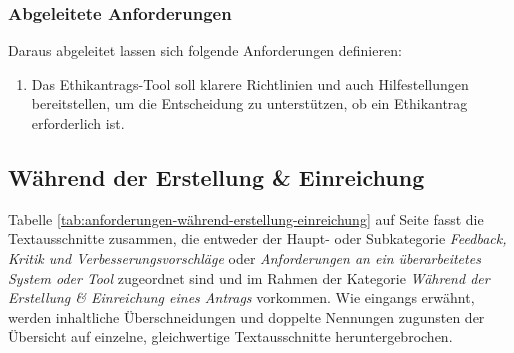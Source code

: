\documentclass[a4paper,12pt,twoside,numbers=noendperiod]{scrreprt}
\begin{document}
\subsubsection*{Abgeleitete Anforderungen}
\label{sub-sub-sec:abgeleitete-anforderungen-vorfeld-antrag}

Daraus abgeleitet lassen sich folgende Anforderungen definieren:
\begin{enumerate}[label=\textbf{\#\arabic*}]
    \item Das Ethikantrags-Tool soll klarere Richtlinien und auch Hilfestellungen bereitstellen, um die Entscheidung zu unterstützen, ob ein Ethikantrag erforderlich ist.
\end{enumerate}

\subsection{Während der Erstellung \& Einreichung}
\label{sub-sec:während-erstellung-einreichung}

Tabelle \ref{tab:anforderungen-während-erstellung-einreichung} auf Seite \pageref{tab:anforderungen-während-erstellung-einreichung} fasst die Textausschnitte zusammen, die entweder der Haupt- oder Subkategorie \textit{Feedback, Kritik und Verbesserungsvorschläge} oder \textit{Anforderungen an ein überarbeitetes System oder Tool} zugeordnet sind und im Rahmen der Kategorie \textit{Während der Erstellung \& Einreichung eines Antrags} vorkommen. Wie eingangs erwähnt, werden inhaltliche Überschneidungen und doppelte Nennungen zugunsten der Übersicht auf einzelne, gleichwertige Textausschnitte heruntergebrochen.
\end{document}
